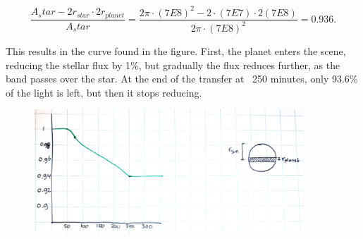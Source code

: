 \begin{equation}
    \frac{A_star-2r_{star}\cdot 2 r_{planet}}{A_star} = \frac{2\pi \cdot (7E8)^2 - 2\cdot (7E7)\cdot 2 (7E8)}{2\pi \cdot (7E8)^2} = 0.936.
\end{equation}

This results in the curve found in the figure. First, the planet enters the scene, reducing the stellar flux by 1\%, but gradually the flux reduces further, as the band passes over the star. At the end of the transfer at ~250 minutes, only 93.6\% of the light is left, but then it stops reducing. 

\begin{figure}[H]
    \centering
    \includegraphics[width=0.9\textwidth]{figures/5d.jpg}
    \label{fig:my_label5}
\end{figure}
